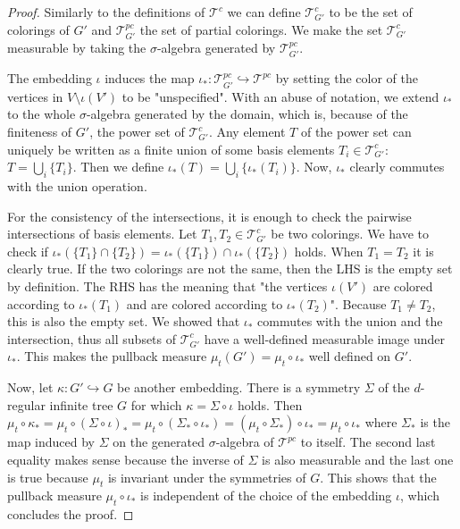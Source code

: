 \documentclass{article}
\theoremstyle{definition}
\begin{document}
\begin{proof}
	Similarly to the definitions of $\mathcal T^c$ we can define $\mathcal T^c_{G'}$ to be the set of colorings of $G'$ and $\mathcal T^{pc}_{G'}$ the set of partial colorings. We make the set $\mathcal T^c_{G'}$ measurable by taking the $\sigma$-algebra generated by $\mathcal T^{pc}_{G'}.$

	The embedding $\iota$ induces the map $\iota_*:\mathcal T^{pc}_{G'}\hookrightarrow\mathcal T^{pc}$ by setting the color of the vertices in $V\setminus\iota(V')$ to be "unspecified". With an abuse of notation, we extend $\iota_*$ to the whole $\sigma$-algebra generated by the domain, which is, because of the finiteness of $G'$, the power set of $\mathcal T^c_{G'}.$ Any element $T$ of the power set can uniquely be written as a finite union of some basis elements $T_i\in\mathcal T^c_{G'}$: $T=\bigcup_{i}\{T_i\}$. Then we define $\iota_*(T)=\bigcup_i\{\iota_*(T_i)\}$. Now, $\iota_*$ clearly commutes with the union operation.

	For the consistency of the intersections, it is enough to check the pairwise intersections of basis elements. Let $T_1,T_2\in\mathcal{T}^c_{G'}$ be two colorings. We have to check if $\iota_*(\{T_1\}\cap\{T_2\})=\iota_*(\{T_1\})\cap\iota_*(\{T_2\})$ holds. When $T_1=T_2$ it is clearly true. If the two colorings are not the same, then the LHS is the empty set by definition. The RHS has the meaning that "the vertices $\iota(V')$ are colored according to $\iota_*(T_1)$ and are colored according to $\iota_*(T_2)$". Because $T_1\neq T_2$, this is also the empty set. We showed that $\iota_*$ commutes with the union and the intersection, thus all subsets of $\mathcal T^c_{G'}$ have a well-defined measurable image under $\iota_*$. This makes the pullback measure $\mu_t(G')=\mu_t\circ\iota_*$ well defined on $G'$.

 Now, let $\kappa:G'\hookrightarrow G$ be another embedding. There is a symmetry $\Sigma$ of the $d$-regular infinite tree $G$ for which $\kappa = \Sigma\circ\iota$ holds. Then $\mu_t\circ\kappa_*=\mu_t\circ{(\Sigma\circ\iota)_*}=\mu_t\circ(\Sigma_*\circ\iota_*)=(\mu_t\circ\Sigma_*)\circ\iota_*=\mu_t\circ\iota_*$ where $\Sigma_*$ is the map induced by $\Sigma$ on the generated $\sigma$-algebra of $\mathcal T^{pc}$ to itself. The second last equality makes sense because the inverse of $\Sigma$ is also measurable and the last one is true because $\mu_t$ is invariant under the symmetries of $G$. This shows that the pullback measure $\mu_t\circ\iota_*$ is independent of the choice of the embedding $\iota$, which concludes the proof.
\end{proof}
\end{document}

